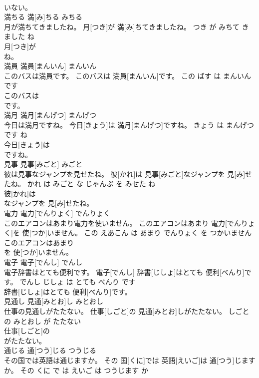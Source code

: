\documentclass[8pt]{extreport}
\begin{document}
\begin{CJK}{UTF8}{min}
\\	いない。			
\\	満ちる	満[み]ちる	みちる	
\\	月が満ちてきましたね。	月[つき]が 満[み]ちてきましたね。	つき が みちて きました ね	
\\	月[つき]が
\\	ね。			
\\	満員	満員[まんいん]	まんいん	
\\	このバスは満員です。	このバスは 満員[まんいん]です。	この ばす は まんいん です	
\\	このバスは
\\	です。			
\\	満月	満月[まんげつ]	まんげつ	
\\	今日は満月ですね。	今日[きょう]は 満月[まんげつ]ですね。	きょう は まんげつ です ね	
\\	今日[きょう]は
\\	ですね。			
\\	見事	見事[みごと]	みごと	
\\	彼は見事なジャンプを見せたね。	彼[かれ]は 見事[みごと]なジャンプを 見[み]せたね。	かれ は みごと な じゃんぷ を みせた ね	
\\	彼[かれ]は
\\	なジャンプを 見[み]せたね。			
\\	電力	電力[でんりょく]	でんりょく	
\\	このエアコンはあまり電力を使いません。	このエアコンはあまり 電力[でんりょく]を 使[つか]いません。	この えあこん は あまり でんりょく を つかいません	
\\	このエアコンはあまり
\\	を 使[つか]いません。			
\\	電子	電子[でんし]	でんし	
\\	電子辞書はとても便利です。	電子[でんし] 辞書[じしょ]はとても 便利[べんり]です。	でんし じしょ は とても べんり です	
\\	辞書[じしょ]はとても 便利[べんり]です。			
\\	見通し	見通[みとお]し	みとおし	
\\	仕事の見通しがたたない。	仕事[しごと]の 見通[みとお]しがたたない。	しごと の みとおし が たたない	
\\	仕事[しごと]の
\\	がたたない。			
\\	通じる	通[つう]じる	つうじる	
\\	その国では英語は通じますか。	その 国[くに]では 英語[えいご]は 通[つう]じますか。	その くに で は えいご は つうじます か	

\end{CJK}
\end{document}
